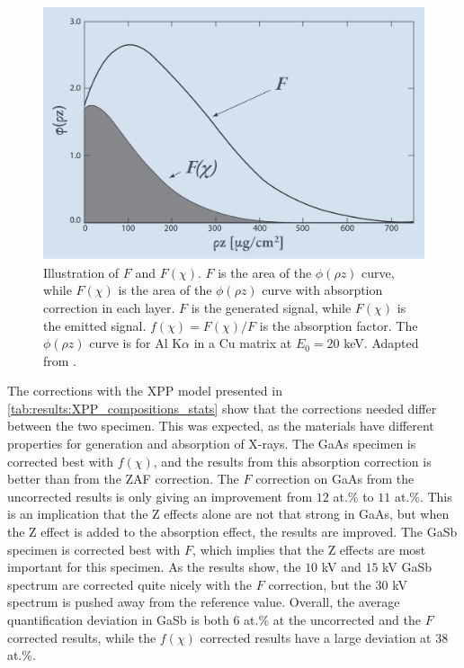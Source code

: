 \begin{figure}[hbtp]
    \centering
    \includegraphics[width=0.75\linewidth]{figures/discussion/xpp_absorption_correction.png}
    \caption{
        Illustration of $F$ and $F(\chi)$.
        $F$ is the area of the $\phi(\rho z)$ curve, while $F(\chi)$ is the area of the $\phi(\rho z)$ curve with absorption correction in each layer.
        $F$ is the generated signal, while $F(\chi)$ is the emitted signal.
        $f(\chi) = F(\chi) / F$ is the absorption factor.
        The $\phi(\rho z)$ curve is for Al K$\alpha$ in a Cu matrix at $E_0 = 20$ keV.
        Adapted from \cite[Fig. 19.14]{goldstein_scanning_2018}.
    }
    \label{fig:discussion:pap:F_and_Fchi}
\end{figure}


The corrections with the XPP model presented in \cref{tab:results:XPP_compositions_stats} show that the corrections needed differ between the two specimen.
This was expected, as the materials have different properties for generation and absorption of X-rays.
The GaAs specimen is corrected best with $f(\chi)$, and the results from this absorption correction is better than from the ZAF correction.
The $F$ correction on GaAs from the uncorrected results is only giving an improvement from $12$ at.\% to $11$ at.\%.
This is an implication that the Z effects alone are not that strong in GaAs, but when the Z effect is added to the absorption effect, the results are improved.
The GaSb specimen is corrected best with $F$, which implies that the Z effects are most important for this specimen.
As the results show, the $10$ kV and $15$ kV GaSb spectrum are corrected quite nicely with the $F$ correction, but the $30$ kV spectrum is pushed away from the reference value.
Overall, the average quantification deviation in GaSb is both $6$ at.\% at the uncorrected and the $F$ corrected results, while the $f(\chi)$ corrected results have a large deviation at $38$ at.\%.

